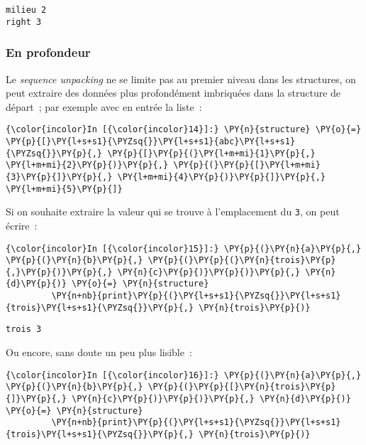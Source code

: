     \begin{Verbatim}[commandchars=\\\{\}]
milieu 2
right 3

    \end{Verbatim}

    \hypertarget{en-profondeur}{%
\subsubsection{En profondeur}\label{en-profondeur}}

    Le \emph{sequence unpacking} ne se limite pas au premier niveau dans les
structures, on peut extraire des données plus profondément imbriquées
dans la structure de départ~; par exemple avec en entrée la liste~:

    \begin{Verbatim}[commandchars=\\\{\}]
{\color{incolor}In [{\color{incolor}14}]:} \PY{n}{structure} \PY{o}{=} \PY{p}{[}\PY{l+s+s1}{\PYZsq{}}\PY{l+s+s1}{abc}\PY{l+s+s1}{\PYZsq{}}\PY{p}{,} \PY{p}{[}\PY{p}{(}\PY{l+m+mi}{1}\PY{p}{,} \PY{l+m+mi}{2}\PY{p}{)}\PY{p}{,} \PY{p}{(}\PY{p}{[}\PY{l+m+mi}{3}\PY{p}{]}\PY{p}{,} \PY{l+m+mi}{4}\PY{p}{)}\PY{p}{]}\PY{p}{,} \PY{l+m+mi}{5}\PY{p}{]}
\end{Verbatim}


    Si on souhaite extraire la valeur qui se trouve à l'emplacement du
\texttt{3}, on peut écrire~:

    \begin{Verbatim}[commandchars=\\\{\}]
{\color{incolor}In [{\color{incolor}15}]:} \PY{p}{(}\PY{n}{a}\PY{p}{,} \PY{p}{(}\PY{n}{b}\PY{p}{,} \PY{p}{(}\PY{p}{(}\PY{n}{trois}\PY{p}{,}\PY{p}{)}\PY{p}{,} \PY{n}{c}\PY{p}{)}\PY{p}{)}\PY{p}{,} \PY{n}{d}\PY{p}{)} \PY{o}{=} \PY{n}{structure}
         \PY{n+nb}{print}\PY{p}{(}\PY{l+s+s1}{\PYZsq{}}\PY{l+s+s1}{trois}\PY{l+s+s1}{\PYZsq{}}\PY{p}{,} \PY{n}{trois}\PY{p}{)}
\end{Verbatim}


    \begin{Verbatim}[commandchars=\\\{\}]
trois 3

    \end{Verbatim}

    Ou encore, sans doute un peu plus lisible~:

    \begin{Verbatim}[commandchars=\\\{\}]
{\color{incolor}In [{\color{incolor}16}]:} \PY{p}{(}\PY{n}{a}\PY{p}{,} \PY{p}{(}\PY{n}{b}\PY{p}{,} \PY{p}{(}\PY{p}{[}\PY{n}{trois}\PY{p}{]}\PY{p}{,} \PY{n}{c}\PY{p}{)}\PY{p}{)}\PY{p}{,} \PY{n}{d}\PY{p}{)} \PY{o}{=} \PY{n}{structure}
         \PY{n+nb}{print}\PY{p}{(}\PY{l+s+s1}{\PYZsq{}}\PY{l+s+s1}{trois}\PY{l+s+s1}{\PYZsq{}}\PY{p}{,} \PY{n}{trois}\PY{p}{)}
\end{Verbatim}


